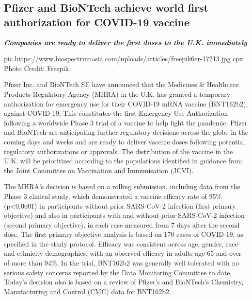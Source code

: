  
 
 
 
 
 
\subsection{Pfizer and BioNTech achieve world first authorization for COVID-19 vaccine}
\label{sec:02_12_2020.sites.biospectrumasia.1.pfizer_biontech_vaccine}

\begin{leftbar}
  \begingroup
    \em\Large\bfseries\color{blue}
    Companies are ready to deliver the first doses to the U.K. immediately 
  \endgroup
\end{leftbar}


\ifcmt
  pic https://www.biospectrumasia.com/uploads/articles/freepik6er-17213.jpg
	cpx Photo Credit: Freepik
\fi

Pfizer Inc. and BioNTech SE have announced that the Medicines \& Healthcare
Products Regulatory Agency (MHRA) in the U.K. has granted a temporary
authorization for emergency use for their COVID-19 mRNA vaccine (BNT162b2),
against COVID-19. This constitutes the first Emergency Use Authorization
following a worldwide Phase 3 trial of a vaccine to help fight the pandemic.
Pfizer and BioNTech are anticipating further regulatory decisions across the
globe in the coming days and weeks and are ready to deliver vaccine doses
following potential regulatory authorizations or approvals. The distribution of
the vaccine in the U.K. will be prioritized according to the populations
identified in guidance from the Joint Committee on Vaccination and Immunisation
(JCVI).

The MHRA’s decision is based on a rolling submission, including data from the
Phase 3 clinical study, which demonstrated a vaccine efficacy rate of 95\%
(p<0.0001) in participants without prior SARS-CoV-2 infection (first primary
objective) and also in participants with and without prior SARS-CoV-2 infection
(second primary objective), in each case measured from 7 days after the second
dose. The first primary objective analysis is based on 170 cases of COVID-19,
as specified in the study protocol. Efficacy was consistent across age, gender,
race and ethnicity demographics, with an observed efficacy in adults age 65 and
over of more than 94\%. In the trial, BNT162b2 was generally well tolerated with
no serious safety concerns reported by the Data Monitoring Committee to date.
Today’s decision also is based on a review of Pfizer’s and BioNTech’s
Chemistry, Manufacturing and Control (CMC) data for BNT162b2.

